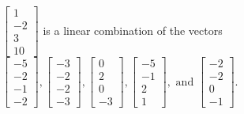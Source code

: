 \begin{exercise}
\begin{exerciseStatement}
  \end{exerciseStatement}
  \begin{exerciseAnswer}
   \(\left[\begin{array}{c}
1 \\
-2 \\
3 \\
10
\end{array}\right]\) 
  	 is  
	a linear combination of the vectors \(\left[\begin{array}{c}
-5 \\
-2 \\
-1 \\
-2
\end{array}\right] , \left[\begin{array}{c}
-3 \\
-2 \\
-2 \\
-3
\end{array}\right] , \left[\begin{array}{c}
0 \\
2 \\
0 \\
-3
\end{array}\right] , \left[\begin{array}{c}
-5 \\
-1 \\
2 \\
1
\end{array}\right] , \text{ and } \left[\begin{array}{c}
-2 \\
-2 \\
0 \\
-1
\end{array}\right]\).

	
  


  \end{exerciseAnswer}
\end{exercise}